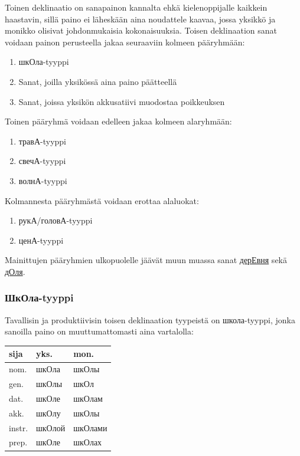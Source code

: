 \documentclass[]{scrreprt}
\providecommand{\tightlist}{%
  \setlength{\itemsep}{0pt}\setlength{\parskip}{0pt}}
\begin{document}
Toinen deklinaatio on sanapainon kannalta ehkä kielenoppijalle kaikkein
haastavin, sillä paino ei läheskään aina noudattele kaavaa, jossa
yksikkö ja monikko olisivat johdonmukaisia kokonaisuuksia. Toisen
deklinaation sanat voidaan painon perusteella jakaa seuraaviin kolmeen
pääryhmään:

\begin{enumerate}
\def\labelenumi{\arabic{enumi}.}
\tightlist
\item
  шкОла-tyyppi
\item
  Sanat, joilla yksikössä aina paino päätteellä
\item
  Sanat, joissa yksikön akkusatiivi muodostaa poikkeuksen
\end{enumerate}

Toinen pääryhmä voidaan edelleen jakaa kolmeen alaryhmään:

\begin{enumerate}
\def\labelenumi{\alph{enumi})}
\tightlist
\item
  травА-tyyppi
\item
  свечА-tyyppi
\item
  волнА-tyyppi
\end{enumerate}

Kolmannesta pääryhmästä voidaan erottaa alaluokat:

\begin{enumerate}
\def\labelenumi{\alph{enumi})}
\tightlist
\item
  рукА/головА-tyyppi
\item
  ценА-tyyppi
\end{enumerate}

Mainittujen pääryhmien ulkopuolelle jäävät muun muassa sanat
\href{http://ru.wiktionary.org/wiki/\%D0\%B4\%D0\%B5\%D1\%80\%D0\%B5\%D0\%B2\%D0\%BD\%D1\%8F}{дерЕвня}
sekä
\href{http://ru.wiktionary.org/wiki/\%D0\%B4\%D0\%BE\%D0\%BB\%D1\%8F}{дОля}.

\subsubsection{ШкОла-tyyppi}\label{ux448ux43aux43eux43bux430-tyyppi}

Tavallisin ja produktiivisin toisen deklinaation tyypeistä on
школа-tyyppi, jonka sanoilla paino on muuttumattomasti aina vartalolla:

\begin{longtable}[c]{@{}lll@{}}
\toprule
sija & yks. & mon.\tabularnewline
\midrule
\endhead
nom. & шкОла & шкОлы\tabularnewline
gen. & шкОлы & шкОл\tabularnewline
dat. & шкОле & шкОлам\tabularnewline
akk. & шкОлу & шкОлы\tabularnewline
instr. & шкОлой & шкОлами\tabularnewline
prep. & шкОле & шкОлах\tabularnewline
\bottomrule
\end{longtable}
\end{document}
